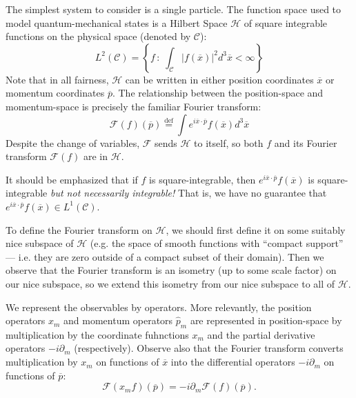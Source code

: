 
The simplest system to consider is a single particle. The
function space used to model quantum-mechanical states is a
Hilbert Space $\mathcal{H}$ of square integrable functions on the
physical space (denoted by $\mathcal{C}$):
\begin{equation}%
L^{2}(\mathcal{C}) = \left\{f\,:\;\int_{\mathcal{C}}|f(\overline{x})|^{2}d^{3}\overline{x}<\infty\right\}
\end{equation}
Note that in all fairness, $\mathcal{H}$ can be written in either
position coordinates $\overline{x}$ or momentum coordinates
$\overline{p}$. The relationship between the position-space and
momentum-space is precisely the familiar Fourier transform:
\begin{equation}%
\mathcal{F}(f)(\overline{p}) \stackrel{\text{def}}{=} \int e^{i\overline{x}\cdot\overline{p}}f(\overline{x})d^{3}\overline{x}
\end{equation}
Despite the change of variables, $\mathcal{F}$ sends
$\mathcal{H}$ to itself, so both $f$ and its Fourier transform
$\mathcal{F}(f)$ are in $\mathcal{H}$.
\begin{rmk}
It should be emphasized that if $f$ is square-integrable, then
$e^{i\overline{x}\cdot\overline{p}}f(\overline{x})$ is
square-integrable \emph{but not necessarily integrable!} That is,
we have no guarantee that
$e^{i\overline{x}\cdot\overline{p}}f(\overline{x})\in L^{1}(\mathcal{C})$.

To define the Fourier transform on $\mathcal{H}$, we should first
define it on some suitably nice subspace of $\mathcal{H}$
(e.g. the space of smooth functions with ``compact support'' ---
i.e. they are zero outside of a compact subset of their
domain). Then we observe that the Fourier transform is an
isometry (up to some scale factor) on our nice subspace, so we
extend this isometry from our nice subspace to all of $\mathcal{H}$.
\end{rmk}

We represent the observables by operators. More relevantly, the
position operators $\widehat{x}_{m}$ and momentum operators
$\widehat{p}_{m}$ are represented in position-space by
multiplication by the coordinate fuhnctions $x_{m}$ and the
partial derivative operators $-i\partial_{m}$
(respectively). Observe also that the Fourier transform converts
multiplication by $x_{m}$ on functions of $\overline{x}$ into the
differential operators $-i\partial_{m}$ on functions of
$\overline{p}$:
\begin{equation}%
\mathcal{F}(x_{m}f)(\overline{p})=-i\partial_{m}\mathcal{F}(f)(\overline{p}).
\end{equation}

